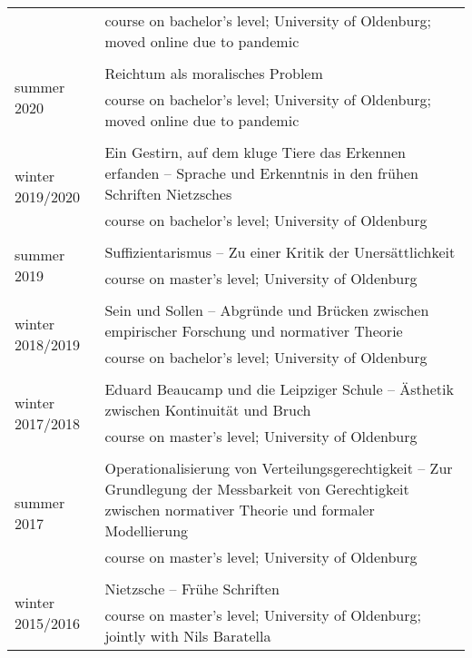 \documentclass[a4paper,10pt]{article}
\begin{document}
\begin{longtable}{p{2.25cm}p{11cm}}
& \footnotesize{course on bachelor's level; University of Oldenburg; moved online due to pandemic}\\
\\
\multirow{2}{2.25cm}{\footnotesize{summer 2020}} & Reichtum als moralisches Problem\\
& \footnotesize{course on bachelor's level; University of Oldenburg; moved online due to pandemic}\\
\\
\multirow{2}{2.25cm}{\footnotesize{winter 2019/2020}} & Ein Gestirn, auf dem kluge Tiere das Erkennen erfanden -- Sprache und Erkenntnis in den frühen Schriften Nietzsches\\
& \footnotesize{course on bachelor's level; University of Oldenburg}\\
\\
\multirow{2}{2.25cm}{\footnotesize{summer 2019}} & Suffizientarismus -- Zu einer Kritik der Unersättlichkeit\\
& \footnotesize{course on master's level; University of Oldenburg}\\
\\
\multirow{2}{2.25cm}{\footnotesize{winter 2018/2019}} & Sein und Sollen -- Abgründe und Brücken zwischen empirischer Forschung und normativer Theorie\\
& \footnotesize{course on bachelor's level; University of Oldenburg}\\
\\
\multirow{2}{2.25cm}{\footnotesize{winter 2017/2018}} & Eduard Beaucamp und die Leipziger Schule -- Ästhetik zwischen Kontinuität und Bruch\\
& \footnotesize{course on master's level; University of Oldenburg}\\
\\
\multirow{2}{2.25cm}{\footnotesize{summer 2017}} & Operationalisierung von Verteilungsgerechtigkeit -- Zur Grundlegung der Messbarkeit von Gerechtigkeit zwischen normativer Theorie und formaler Modellierung\\
& \footnotesize{course on master's level; University of Oldenburg}\\
\\
\multirow{2}{2.25cm}{\footnotesize{winter 2015/2016}} & Nietzsche -- Frühe Schriften\\
& \footnotesize{course on master's level; University of Oldenburg; jointly with Nils Baratella}\\
\end{longtable}
\end{document}
